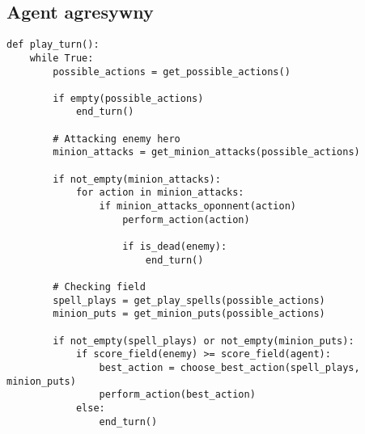 \subsection{Agent agresywny}

\begin{verbatim}
def play_turn():
	while True:
		possible_actions = get_possible_actions()
		
		if empty(possible_actions)
			end_turn()
		
		# Attacking enemy hero
		minion_attacks = get_minion_attacks(possible_actions)
		
		if not_empty(minion_attacks):
			for action in minion_attacks:
				if minion_attacks_oponnent(action)
					perform_action(action)
				
					if is_dead(enemy):
						end_turn()
			
		# Checking field	
		spell_plays = get_play_spells(possible_actions)
		minion_puts = get_minion_puts(possible_actions)
				
		if not_empty(spell_plays) or not_empty(minion_puts):
			if score_field(enemy) >= score_field(agent):
				best_action = choose_best_action(spell_plays, minion_puts)
				perform_action(best_action)
			else:
				end_turn()
\end{verbatim}